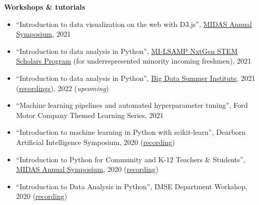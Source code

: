 \documentclass[11pt]{article}
\newenvironment{main}
{\begin{adjustwidth}{3em}{}}
{\end{adjustwidth}}
\begin{document}
\begin{main}
\textbf{Workshops \& tutorials}

\begin{itemize}
    \item ``Introduction to data visualization on the web with D3.js'', \href{https://midas.umich.edu/2021-symposium/}{MIDAS Annual Symposium}, 2021
    \item ``Introduction to data analysis in Python'', \href{https://www.milsamp.org/programs/nxtgen-stem-scholars/}{MI-LSAMP NxtGen STEM Scholars Program} (for underrepresented minority incoming freshmen), 2021
    \item ``Introduction to data analysis in Python'', \href{https://sph.umich.edu/bdsi/}{Big Data Summer Institute}, 2021 (\href{http://bigdatasummerinst.sph.umich.edu/wiki/index.php/Main_Page#Week_2}{recordings}), 2022 (\textit{upcoming})
    \item ``Machine learning pipelines and automated hyperparameter tuning'', Ford Motor Company Themed Learning Series, 2021
    \item ``Introduction to machine learning in Python with scikit-learn'', Dearborn Artificial Intelligence Symposium, 2020 (\href{https://www.youtube.com/watch?v=TD4wCHNhZcU}{recording})
    \item ``Introduction to Python for Community and K-12 Teachers \& Students'', \href{https://midas.umich.edu/2020-symposium/}{MIDAS Annual Symposium}, 2020 (\href{https://youtu.be/r_sfBJIDMtM}{recording})
    \item ``Introduction to Data Analysis in Python'', IMSE Department Workshop, 2020 (\href{https://youtu.be/7IsFmtvBOyc}{recording})
\end{itemize}


\end{main}
\end{document}
